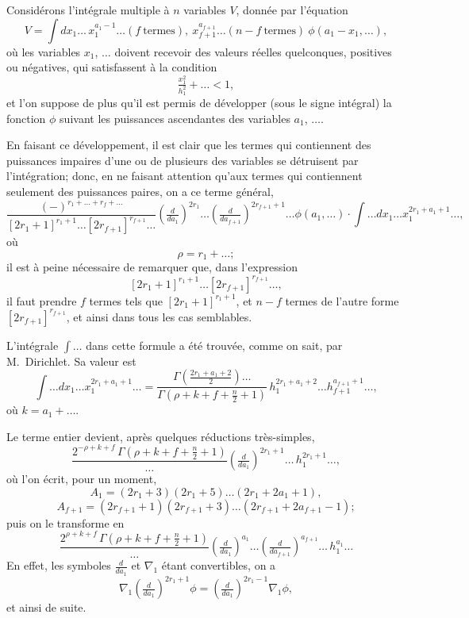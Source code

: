 \documentclass[12pt,a4paper]{article}
\begin{document}
Consid\'erons l'int\'egrale multiple \`a $n$ variables $V$, donn\'ee par l'\'equation
\[
V = \int dx_1 \ldots\, x_1^{a_1 - 1}\ldots (f\ \text{termes}),\ x_{f+1}^{a_{f+1}}\ldots (n - f\ \text{termes})\ \phi(a_1 - x_1, \ldots),
\]
o\`u les variables $x_1$, $\ldots$ doivent recevoir des valeurs r\'eelles quelconques, positives ou n\'egatives, qui satisfassent \`a la condition
\[
\tfrac{x_1^2}{h_1^2} + \ldots < 1,
\]
et l'on suppose de plus qu'il est permis de d\'evelopper (sous le signe int\'egral) la fonction $\phi$ suivant les puissances ascendantes des variables $a_1$, $\ldots$.

En faisant ce d\'eveloppement, il est clair que les termes qui contiennent des puissances impaires d'une ou de plusieurs des variables se d\'etruisent par l'int\'egration; donc, en ne faisant attention qu'aux termes qui contiennent seulement des puissances paires, on a ce terme g\'en\'eral,
\[
\frac{(-)^{r_1 + \ldots + r_f + \ldots}}{[2r_1 + 1]^{r_1 + 1}\ldots [2r_{f+1}]^{r_{f+1}}\ldots}\left(\tfrac{d}{da_1}\right)^{2r_1}\ldots\left(\tfrac{d}{da_{f+1}}\right)^{2r_{f+1}+1}\ldots \phi(a_1, \ldots) \cdot \int\ldots dx_1\ldots x_1^{2r_1 + a_1 + 1}\ldots,
\]
o\`u
\[
\rho = r_1 + \ldots;
\]
il est \`a peine n\'ecessaire de remarquer que, dans l'expression
\[
[2r_1 + 1]^{r_1 + 1}\ldots [2r_{f+1}]^{r_{f+1}}\ldots,
\]
il faut prendre $f$ termes tels que $[2r_1 + 1]^{r_1 + 1}$, et $n - f$ termes de l'autre forme $[2r_{f+1}]^{r_{f+1}}$, et ainsi dans tous les cas semblables.

L'int\'egrale $\int\ldots$ dans cette formule a \'et\'e trouv\'ee, comme on sait, par M.~Dirichlet. Sa valeur est
\[
\int\ldots dx_1\ldots x_1^{2r_1 + a_1 + 1}\ldots = \frac{\Gamma(\tfrac{2r_1 + a_1 + 2}{2})\ldots}{\Gamma(\rho + k + f + \tfrac{n}{2} + 1)}\,h_1^{2r_1 + a_1 + 2}\ldots h_{f+1}^{a_{f+1}+1}\ldots,
\]
o\`u $k = a_1 + \ldots$.

\newpage
\setcounter{page}{197}

Le terme entier devient, apr\`es quelques r\'eductions tr\`es-simples,
\[
\frac{2^{-\rho + k + f}\,\Gamma(\rho + k + f + \tfrac{n}{2} + 1)}{\ldots}\left(\tfrac{d}{da_1}\right)^{2r_1 + 1}\ldots\, h_1^{2r_1 + 1}\ldots,
\]
o\`u l'on \'ecrit, pour un moment,
\[
A_1 = (2r_1 + 3)(2r_1 + 5)\ldots(2r_1 + 2a_1 + 1),
\]
\[
A_{f+1} = (2r_{f+1} + 1)(2r_{f+1} + 3)\ldots(2r_{f+1} + 2a_{f+1} - 1);
\]
puis on le transforme en
\[
\frac{2^{\rho + k + f}\,\Gamma(\rho + k + f + \tfrac{n}{2} + 1)}{\ldots}\left(\tfrac{d}{da_1}\right)^{a_1}\ldots\left(\tfrac{d}{da_{f+1}}\right)^{a_{f+1}}\ldots\,h_1^{a_1}\ldots
\]
En effet, les symboles $\tfrac{d}{da_1}$ et $\nabla_1$ \'etant convertibles, on a
\[
\nabla_1\left(\tfrac{d}{da_1}\right)^{2r_1 + 1}\phi = \left(\tfrac{d}{da_1}\right)^{2r_1 - 1}\nabla_1\phi,
\]
et ainsi de suite.
\end{document}
